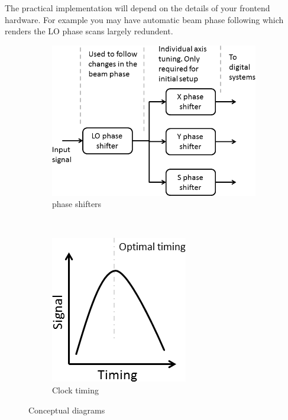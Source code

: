 \documentclass{report}
\begin{document}
The practical implementation will depend on the details of your frontend hardware. For example you may have automatic beam phase following which renders the LO phase scans largely redundent.
\begin{figure}[hbt]
   \centering
    \begin{subfigure}[b]{0.45\textwidth}
        \includegraphics[width=\textwidth]{phase_shifters_overview.png}
        \caption{phase shifters}
        \label{fig:phase_shifters}
    \end{subfigure}
    ~ %
    \begin{subfigure}[b]{0.3\textwidth}
        \includegraphics[width=\textwidth]{timing_overview.png}
        \caption{Clock timing}
        \label{fig:clock_timing}
    \end{subfigure}
    \caption{Conceptual diagrams}\label{fig:Conceptual_diagrams}
\end{figure}
\end{document}
